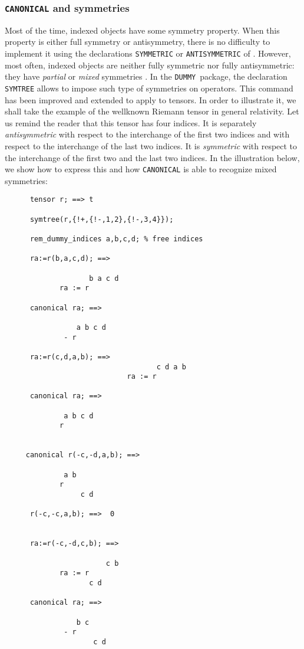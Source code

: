\subsubsection{\texttt{CANONICAL} and symmetries}

Most of the time, indexed objects have some symmetry property.
When this property is either full symmetry or antisymmetry, there
is no difficulty to implement it using the declarations
\texttt{SYMMETRIC} or
\texttt{ANTISYMMETRIC}
of \REDUCE. However, most often, indexed objects are neither
fully symmetric nor fully antisymmetric: they have \emph{partial}
or \emph{mixed} symmetries%
%
.
In the \texttt{DUMMY}\ package, the declaration
\texttt{SYMTREE} allows to impose such type of symmetries
on operators. This command has been improved and extended to
apply to tensors.
In order to illustrate it, we shall take the example of the
wellknown Riemann
tensor in general relativity.
 Let us remind the reader
that this tensor has four indices. It is separately \emph{antisymmetric} with
respect to the interchange of the first two indices and with respect to the
interchange of the last two indices. It is \emph{symmetric} with respect to
the interchange of the first two and the last two indices.
In the illustration below, we show how to express this and how
\texttt{CANONICAL} is able to recognize mixed symmetries:
\begin{verbatim}
      tensor r; ==> t

      symtree(r,{!+,{!-,1,2},{!-,3,4}});

      rem_dummy_indices a,b,c,d; % free indices

      ra:=r(b,a,c,d); ==>

                    b a c d
             ra := r

      canonical ra; ==>

                 a b c d
              - r

      ra:=r(c,d,a,b); ==>
                                    c d a b
                             ra := r

      canonical ra; ==>

              a b c d
             r


     canonical r(-c,-d,a,b); ==>

              a b
             r
                  c d

      r(-c,-c,a,b); ==>  0


      ra:=r(-c,-d,c,b); ==>

                        c b
             ra := r
                    c d

      canonical ra; ==>

                 b c
              - r
                     c d
\end{verbatim}
